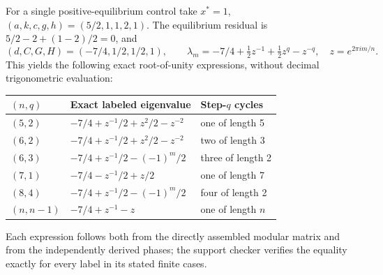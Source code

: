 \documentclass[11pt]{article}
\begin{document}
For a single positive-equilibrium control take
$x^*=1$, $(a,k,c,g,h)=(5/2,1,1,2,1)$. The equilibrium residual is
$5/2-2+(1-2)/2=0$, and
\[
 (d,C,G,H)=(-7/4,1/2,1/2,1),\qquad
 \lambda_m=-7/4+\tfrac12z^{-1}+\tfrac12z^q-z^{-q},
 \quad z=e^{2\pi im/n}.
\]
This yields the following exact root-of-unity expressions, without
decimal trigonometric evaluation:
\begin{center}
\begin{tabular}{lll}
\toprule $(n,q)$ & Exact labeled eigenvalue & Step-$q$ cycles\\
\midrule
$(5,2)$ & $-7/4+z^{-1}/2+z^2/2-z^{-2}$ & one of length 5\\
$(6,2)$ & $-7/4+z^{-1}/2+z^2/2-z^{-2}$ & two of length 3\\
$(6,3)$ & $-7/4+z^{-1}/2-(-1)^m/2$ & three of length 2\\
$(7,1)$ & $-7/4-z^{-1}/2+z/2$ & one of length 7\\
$(8,4)$ & $-7/4+z^{-1}/2-(-1)^m/2$ & four of length 2\\
$(n,n-1)$ & $-7/4+z^{-1}-z$ & one of length $n$\\
\bottomrule
\end{tabular}
\end{center}
Each expression follows both from the directly assembled modular matrix
and from the independently derived phases; the support checker verifies
the equality exactly for every label in its stated finite cases.
\end{document}
